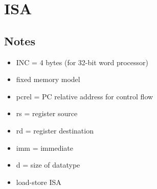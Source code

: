 \documentclass[10pt]{article}
\begin{document}
{
    \section{ISA}

    \subsection{Notes}
    \begin{itemize}
      \item INC = 4 bytes (for 32-bit word processor)
      \item fixed memory model
      \item pcrel = PC relative address for control flow
      \item rs = register source
      \item rd = register destination
      \item imm = immediate
      \item d = size of datatype
      \item load-store ISA
    \end{itemize}

}
\end{document}
